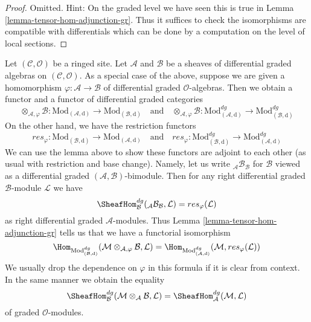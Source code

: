 \begin{proof}
Omitted. Hint: On the graded level we have seen this is true in
Lemma \ref{lemma-tensor-hom-adjunction-gr}. Thus it suffices
to check the isomorphisms are compatible with differentials
which can be done by a computation on the level of local sections.
\end{proof}

\noindent
Let $(\mathcal{C}, \mathcal{O})$ be a ringed site. Let $\mathcal{A}$
and $\mathcal{B}$ be a sheaves of differential graded algebras on
$(\mathcal{C}, \mathcal{O})$.
As a special case of the above, suppose we are given
a homomorphism $\varphi : \mathcal{A} \to \mathcal{B}$
of differential graded $\mathcal{O}$-algebras. Then we obtain a functor
and a functor of differential graded categories
$$
\otimes_{\mathcal{A}, \varphi} \mathcal{B} :
\text{Mod}_{(\mathcal{A}, \text{d})}
\longrightarrow
\text{Mod}_{(\mathcal{B}, \text{d})}
\quad\text{and}\quad
\otimes_{\mathcal{A}, \varphi} \mathcal{B} :
\text{Mod}^{dg}_{(\mathcal{A}, \text{d})}
\longrightarrow
\text{Mod}^{dg}_{(\mathcal{B}, \text{d})}
$$
On the other hand, we have the restriction functors
$$
res_\varphi :
\text{Mod}_{(\mathcal{B}, \text{d})}
\longrightarrow
\text{Mod}_{(\mathcal{A}, \text{d})}
\quad\text{and}\quad
res_\varphi :
\text{Mod}^{dg}_{(\mathcal{B}, \text{d})}
\longrightarrow
\text{Mod}^{dg}_{(\mathcal{A}, \text{d})}
$$
We can use the lemma above to show these functors are adjoint to
each other (as usual with restriction and base change). Namely,
let us write ${}_\mathcal{A}\mathcal{B}_\mathcal{B}$ for
$\mathcal{B}$ viewed as a differential graded
$(\mathcal{A}, \mathcal{B})$-bimodule.
Then for any right differential graded $\mathcal{B}$-module $\mathcal{L}$
we have
$$
\SheafHom_\mathcal{B}^{dg}({}_\mathcal{A}\mathcal{B}_\mathcal{B}, \mathcal{L})
= res_\varphi(\mathcal{L})
$$
as right differential graded $\mathcal{A}$-modules. Thus
Lemma \ref{lemma-tensor-hom-adjunction-gr}
tells us that we have a functorial isomorphism
$$
\Hom_{\text{Mod}_{(\mathcal{B}, \text{d})}^{dg}}(
\mathcal{M} \otimes_{\mathcal{A}, \varphi} \mathcal{B}, \mathcal{L}) =
\Hom_{\text{Mod}_{(\mathcal{A}, \text{d})}^{dg}}(
\mathcal{M}, res_\varphi(\mathcal{L}))
$$
We usually drop the dependence on $\varphi$ in this formula if it
is clear from context. In the same manner we obtain
the equality
$$
\SheafHom^{dg}_\mathcal{B}(
\mathcal{M} \otimes_\mathcal{A} \mathcal{B}, \mathcal{L}) =
\SheafHom_\mathcal{A}^{dg}(\mathcal{M}, \mathcal{L})
$$
of graded $\mathcal{O}$-modules.












